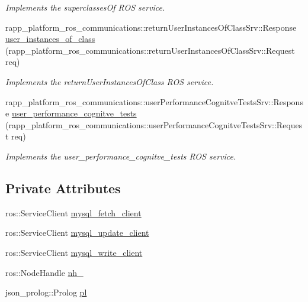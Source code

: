 \begin{DoxyCompactItemize}
\begin{DoxyCompactList}\small\item\em Implements the superclasses\-Of R\-O\-S service. \end{DoxyCompactList}\item 
rapp\-\_\-platform\-\_\-ros\-\_\-communications\-::return\-User\-Instances\-Of\-Class\-Srv\-::\-Response \hyperlink{classKnowrobWrapper_a458f965a337460f5822c71bab7a9180d}{user\-\_\-instances\-\_\-of\-\_\-class} (rapp\-\_\-platform\-\_\-ros\-\_\-communications\-::return\-User\-Instances\-Of\-Class\-Srv\-::\-Request req)
\begin{DoxyCompactList}\small\item\em Implements the return\-User\-Instances\-Of\-Class R\-O\-S service. \end{DoxyCompactList}\item 
rapp\-\_\-platform\-\_\-ros\-\_\-communications\-::user\-Performance\-Cognitve\-Tests\-Srv\-::\-Response \hyperlink{classKnowrobWrapper_aada77adb91efe2be3ddd2ade2e90154a}{user\-\_\-performance\-\_\-cognitve\-\_\-tests} (rapp\-\_\-platform\-\_\-ros\-\_\-communications\-::user\-Performance\-Cognitve\-Tests\-Srv\-::\-Request req)
\begin{DoxyCompactList}\small\item\em Implements the user\-\_\-performance\-\_\-cognitve\-\_\-tests R\-O\-S service. \end{DoxyCompactList}\end{DoxyCompactItemize}
\subsection*{Private Attributes}
\begin{DoxyCompactItemize}
\item 
ros\-::\-Service\-Client \hyperlink{classKnowrobWrapper_aaa8ac92e0387787a4ba8bdc9a5886c4d}{mysql\-\_\-fetch\-\_\-client}
\item 
ros\-::\-Service\-Client \hyperlink{classKnowrobWrapper_a16a7e3854cd229eabb1675eded4bafb4}{mysql\-\_\-update\-\_\-client}
\item 
ros\-::\-Service\-Client \hyperlink{classKnowrobWrapper_a3751c23317ae08cb539f51ea1eead504}{mysql\-\_\-write\-\_\-client}
\item 
ros\-::\-Node\-Handle \hyperlink{classKnowrobWrapper_a7e3aae6f36c23857030d977fa53e3baf}{nh\-\_\-}
\item 
json\-\_\-prolog\-::\-Prolog \hyperlink{classKnowrobWrapper_a85cb0352dccaebe49a4f382d39911400}{pl}
\end{DoxyCompactItemize}



